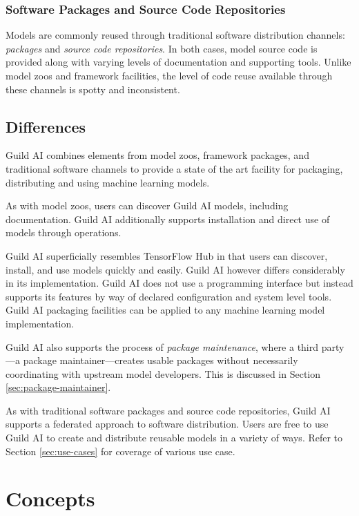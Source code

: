 \documentclass{article}
\begin{document}
\subsubsection{Software Packages and Source Code Repositories}

Models are commonly reused through traditional software distribution
channels: \emph{packages} and \emph{source code repositories}. In both
cases, model source code is provided along with varying levels of
documentation and supporting tools. Unlike model zoos and framework
facilities, the level of code reuse available through these channels
is spotty and inconsistent.

\subsection{Differences}

Guild AI combines elements from model zoos, framework packages, and
traditional software channels to provide a state of the art facility
for packaging, distributing and using machine learning models.

As with model zoos, users can discover Guild AI models, including
documentation. Guild AI additionally supports installation and direct
use of models through operations.

Guild AI superficially resembles TensorFlow Hub in that users can
discover, install, and use models quickly and easily. Guild AI however
differs considerably in its implementation. Guild AI does not use a
programming interface but instead supports its features by way of
declared configuration and system level tools. Guild AI packaging
facilities can be applied to any machine learning model
implementation.

Guild AI also supports the process of \emph{package maintenance},
where a third party---a package maintainer---creates usable packages
without necessarily coordinating with upstream model developers. This
is discussed in Section \ref{sec:package-maintainer}.

As with traditional software packages and source code repositories,
Guild AI supports a federated approach to software distribution. Users
are free to use Guild AI to create and distribute reusable models in a
variety of ways. Refer to Section \ref{sec:use-cases} for coverage of
various use case.

\section{Concepts}
\end{document}
